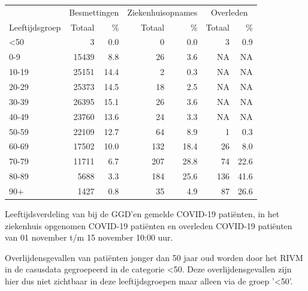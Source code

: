 \documentclass[
  english,
  man,floatsintext]{apa6}
\begin{document}
\begin{table}
\centering\begingroup\fontsize{11}{13}\selectfont

\begin{threeparttable}
\begin{tabular}{lrrrrrr}
\toprule
\multicolumn{1}{c}{ } & \multicolumn{2}{c}{Besmettingen} & \multicolumn{2}{c}{Ziekenhuisopnames} & \multicolumn{2}{c}{Overleden} \\
\cmidrule(l{3pt}r{3pt}){2-3} \cmidrule(l{3pt}r{3pt}){4-5} \cmidrule(l{3pt}r{3pt}){6-7}
Leeftijdsgroep & Totaal & \% & Totaal & \% & Totaal & \%\\
\midrule
<50 & 3 & 0.0 & 0 & 0.0 & 3 & 0.9\\
0-9 & 15439 & 8.8 & 26 & 3.6 & NA & NA\\
10-19 & 25151 & 14.4 & 2 & 0.3 & NA & NA\\
20-29 & 25373 & 14.5 & 18 & 2.5 & NA & NA\\
30-39 & 26395 & 15.1 & 26 & 3.6 & NA & NA\\
40-49 & 23760 & 13.6 & 24 & 3.3 & NA & NA\\
50-59 & 22109 & 12.7 & 64 & 8.9 & 1 & 0.3\\
60-69 & 17502 & 10.0 & 132 & 18.4 & 26 & 8.0\\
70-79 & 11711 & 6.7 & 207 & 28.8 & 74 & 22.6\\
80-89 & 5688 & 3.3 & 184 & 25.6 & 136 & 41.6\\
90+ & 1427 & 0.8 & 35 & 4.9 & 87 & 26.6\\
\bottomrule
\end{tabular}
\begin{tablenotes}
\item[1] Leeftijdsverdeling van bij de GGD’en gemelde COVID-19 patiënten, in het ziekenhuis opgenomen COVID-19 patiënten en overleden COVID-19 patiënten van 01 november t/m 15 november 10:00 uur.
\item[2] Overlijdensgevallen van patiënten jonger dan 50 jaar oud worden door het RIVM in de casusdata gegroepeerd in de categorie <50. Deze overlijdensgevallen zijn hier dus niet zichtbaar in deze leeftijdsgroepen maar alleen via de groep '<50'.
\end{tablenotes}
\end{threeparttable}
\endgroup{}
\end{table}

\newpage
\end{document}
